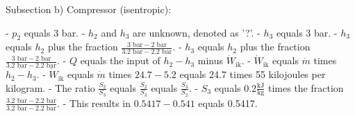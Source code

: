 Subsection b) Compressor (isentropic):

- \( p_2 \) equals 3 bar.
- \( h_2 \) and \( h_3 \) are unknown, denoted as '?'.
- \( h_3 \) equals 3 bar.
- \( h_3 \) equals \( h_2 \) plus the fraction \(\frac{3 \text{ bar} - 2 \text{ bar}}{3.2 \text{ bar} - 2.2 \text{ bar}}\).
- \( h_3 \) equals \( h_2 \) plus the fraction \(\frac{3 \text{ bar} - 2 \text{ bar}}{3.2 \text{ bar} - 2.2 \text{ bar}}\).
- \( Q \) equals the input of \( h_2 - h_3 \) minus \( \dot{W}_{\text{ik}} \).
- \( \dot{W}_{\text{ik}} \) equals \( \dot{m} \) times \( h_2 - h_3 \).
- \( \dot{W}_{\text{ik}} \) equals \( \dot{m} \) times \( 24.7 - 5.2 \) equals 24.7 times 55 kilojoules per kilogram.
- The ratio \( \frac{S_2}{S_3} \) equals \( \frac{S_2}{S_3} \) equals \( \frac{S_3}{S_2} \).
- \( S_3 \) equals \( 0.2 \frac{\text{kJ}}{\text{kg}} \) times the fraction \(\frac{3.2 \text{ bar} - 2.2 \text{ bar}}{3.2 \text{ bar} - 2.2 \text{ bar}}\).
- This results in \( 0.5417 - 0.541 \) equals 0.5417.